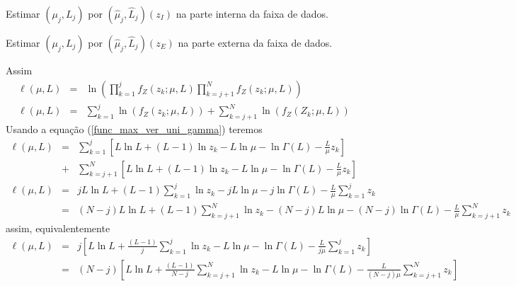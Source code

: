\documentclass[remotesensing,article,submit,moreauthors,pdftex]{Definitions/mdpi}
\begin{document}
Estimar $(\mu_j, L_j )$ por $(\hat{\mu}_j, \hat{L}_j)(z_I)$ na parte interna da faixa de dados.

Estimar $(\mu_j, L_j )$ por $(\hat{\mu}_j, \hat{L}_j)(z_E)$ na parte externa da faixa de dados.


Assim
\begin{equation}\label{cap_acf_16}
\begin{array}{ccc}
 \ell(\mu, L)&=&\ln\left(\prod_{k=1}^{j}f_{Z}(z_k;\mu,L)\prod_{k=j+1}^{N}f_{Z}(z_k;\mu,L)\right)\\
 \ell(\mu, L)&=&\sum_{k=1}^{j}\ln\left(f_{Z}(z_k;\mu,L)\right)+\sum_{k=j+1}^{N}\ln\left(f_{Z}(Z_k;\mu,L)\right)
 \end{array}
 \end{equation}
Usando a equação (\ref{func_max_ver_uni_gamma}) teremos
\begin{equation}\nonumber
\begin{array}{ccc}
  \ell(\mu, L)&=&\sum_{k=1}^{j}\left[L\ln L +(L - 1) \ln z_k-L \ln \mu-\ln \Gamma(L) -\frac{L}{\mu} z_k\right]\\
              &+&\sum_{k=j+1}^{N}\left[L\ln L +(L - 1) \ln z_k-L \ln \mu-\ln \Gamma(L) -\frac{L}{\mu} z_k\right]\\
  \ell(\mu, L)&=&jL\ln L+(L-1)\sum_{k=1}^{j}\ln z_k-jL\ln\mu-j\ln\Gamma(L) -\frac{L}{\mu}\sum_{k=1}^{j} z_k\\
              &=&(N-j)L\ln L+(L-1)\sum_{k=j+1}^{N}\ln z_k-(N-j)L\ln\mu-(N-j)\ln\Gamma(L) -\frac{L}{\mu}\sum_{k=j+1}^{N} z_k
 \end{array}
 \end{equation}
assim, equivalentemente 
 \begin{equation}\nonumber
\begin{array}{ccc}  
  \ell(\mu, L)&=&j\left[L\ln L+\frac{(L-1)}{j}\sum_{k=1}^{j}\ln z_k-L\ln\mu-\ln\Gamma(L) -\frac{L}{j\mu}\sum_{k=1}^{j} z_k\right]\\
              &=&(N-j)\left[L\ln L+\frac{(L-1)}{N-j}\sum_{k=j+1}^{N}\ln z_k-L\ln\mu-\ln\Gamma(L) -\frac{L}{(N-j)\mu}\sum_{k=j+1}^{N} z_k\right]
 \end{array}
 \end{equation}
\end{document}
